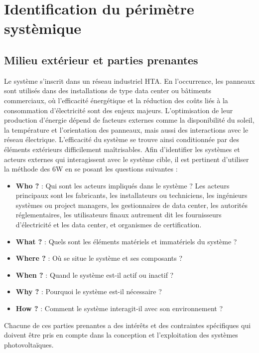 \documentclass{article}
\begin{document}
\section{Identification du périmètre systèmique}


\subsection{Milieu extérieur et parties prenantes}
Le système s'inscrit dans un réseau industriel HTA. En l'occurrence, les panneaux sont utilisés dans des installations de type data center ou bâtiments commerciaux, où l'efficacité énergétique et la réduction des coûts liés à la consommation d'électricité sont des enjeux majeurs. L’optimisation de leur production d’énergie dépend de facteurs externes comme la disponibilité du soleil, la température et l'orientation des panneaux, mais aussi des interactions avec le réseau électrique. L’efficacité du système se trouve ainsi conditionnée par des éléments extérieurs difficilement maîtrisables. 
Afin d'identifier les systèmes et acteurs externes qui interagissent avec le système cible, il est pertinent d'utiliser la méthode des 6W en se posant les questions suivantes :
\begin{itemize}
    \item \textbf{Who ?} : Qui sont les acteurs impliqués dans le système ?
    Les acteurs principaux sont les fabricants, les installateurs ou techniciens, les ingénieurs systèmes ou project managers, les gestionnaires de data center, les autorités réglementaires, les utilisateurs finaux autrement dit les fournisseurs d'électricité et les data center, et organismes de certification.
    \item \textbf{What ?} : Quels sont les éléments matériels et immatériels du système ?
    \item \textbf{Where ?} : Où se situe le système et ses composants ?
    \item \textbf{When ?} : Quand le système est-il actif ou inactif ?
    \item \textbf{Why ?} : Pourquoi le système est-il nécessaire ?
    \item \textbf{How ?} : Comment le système interagit-il avec son environnement ?
\end {itemize}



Chacune de ces parties prenantes a des intérêts et des contraintes spécifiques qui doivent être pris en compte dans la conception et l'exploitation des systèmes photovoltaïques.
\end{document}
